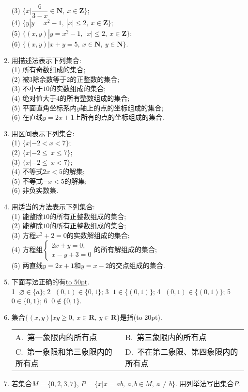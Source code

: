 \documentclass[10pt,a4paper]{article}
\newcommand{\blank}[1]{\underline{\hbox to #1pt{}}}
\newcommand{\bracket}[1]{(\hbox to #1pt{})}
\newcommand{\twoch}[4]{\par\begin{tabular}{p{.46\textwidth}p{.46\textwidth}}
A.~#1& B.~#2\\
C.~#3& D.~#4
\end{tabular}}
\begin{document}
\begin{enumerate}[1.]
(3) $\{x|\dfrac 6{3-x}\in\mathbf{N}, \ x\in\mathbf{Z}\}$;\\
(4) $\{y|y=x^2-1 , \ |x| \le 2, \ x\in\mathbf{Z}\}$;\\
(5) $\{( x,y)|y=x^2-1,\ |x|\le 2, \ x\in\mathbf{Z}\}$;\\
(6) $\{( x,y)|x +y=5, \ x\in\mathbf{N}, \ y\in\mathbf{N}\}$.
\item 用描述法表示下列集合:\\
(1) 所有奇数组成的集合;\\
(2) 被$3$除余数等于$2$的正整数的集合;\\
(3) 不小于$10$的实数组成的集合;\\
(4) 绝对值大于$4$的所有整数组成的集合;\\
(5) 平面直角坐标系内$y$轴上的点的坐标组成的集合;\\
(6) 在直线$y=2x+1$上所有的点的坐标组成的集合.
\item 用区间表示下列集合:\\
(1) $\{x|-2<x<7\}$;\\
(2) $\{x|-2\le\ x\le7\}$;\\
(3) $\{x|-2\le\ x<7\}$;\\
(4) 不等式$2x<5$的解集;\\
(5) 不等式$-x<5$的解集; \\
(6) 非负实数集.
\item 用适当的方法表示下列集合:\\
(1) 能整除$10$的所有正整数组成的集合;\\
(2) 能整除$10$的所有正整数组成的集合;\\
(3) 方程$x^2+2=0$的实数解组成的集合;\\
(4) 方程组$\begin{cases}2x+y=0, \\ x-y+3=0\end{cases}$的所有解组成的集合;\\
(5) 两直线$y=2x+1$和$y=x-2$的交点组成的集合.
\item 下面写法正确的有\blank{50}.\\
\textcircled{1} $\varnothing\in\{a\}$; \textcircled{2} $(0, 1)\in\{0, 1\}$; \textcircled{3} $1 \in \{(0,1)\}$; \textcircled{4} $(0,1) \in \{(0,1)\}$; \textcircled{5} $0\in \{0,1\}$; \textcircled{6} $0 \notin \{0,1\}$.
\item 集合$\{(x, y)|xy\ge 0,\  x\in\mathbf{R},\  y\in\mathbf{R}\}$是指\bracket{20}.
\twoch{第一象限内的所有点}{第三象限内的所有点}{第一象限和第三象限内的所有点}{不在第二象限、第四象限内的所有点}
\item 若集合$M=\{0,2,3,7\}$, $P=\{x|x=ab,\ a,b\in M, \ a\ne b\}$. 用列举法写出集合$P$.

\end{enumerate}
\end{document}
